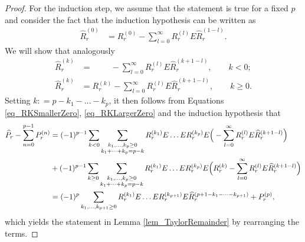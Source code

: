 \documentclass[a4paper,11pt]{article} %
\numberwithin{equation}{section}
\theoremstyle{definition}
\theoremstyle{remark}
\theoremstyle{plain}
\begin{document}
\begin{proof}
  For the induction step, we assume that the statement is true for a fixed 
  \( p \) and consider the fact that the induction hypothesis can be written as
  \begin{align}
          \widehat{R}_{r}^{ (0) } 
    & =
          R_{r}^{ (0) } 
        - 
          \sum_{l = 0}^{ \infty } 
          R_{r}^{ (l) } E \widehat{R}_{r}^{ (1 - l) }.
  \end{align}
  We will show that analogously
  \begin{align}
    \label{eq_RKSmallerZero}
          \widehat{R}_{r}^{ (k) } 
    & = 
        \qquad \
        - \sum_{l = 0}^{ \infty } 
          R_{r}^{ (l) } E \widehat{R}_{r}^{ (k + 1 - l) },
        \qquad k < 0;
    \\
    \label{eq_RKLargerZero}
          \widehat{R}_{r}^{ (k) } 
    & = 
          R_{r}^{ (k) } 
        - 
          \sum_{l = 0}^{ \infty } 
          R_{r}^{ (l) } E \widehat{R}_{r}^{ (k + 1 - l) }, 
        \qquad k \ge 0.
  \end{align}
  Setting \( k: = p - k_{1} - \dots - k_{p} \), it then follows from Equations
  \eqref{eq_RKSmallerZero}, \eqref{eq_RKLargerZero} and the induction hypothesis
  that 
  \begin{align}
         \widehat{P}_{r} - \sum_{n = 0}^{p - 1} P_{r}^{ (n) } 
    & =  
         (-1)^{p - 1} \sum_{k < 0} 
         \sum_{ \substack{ k_{1}, \dots, k_{p} \ge 0 \\
                           k_{1} + \dots + k_{p} = p - k 
                         }
              }
         R_{r}^{ ( k_{1} ) } E \dots E R_{r}^{ ( k_{p} ) } E
         \Big( - \sum_{l = 0}^{ \infty } 
                 R_{r}^{ (l) } E \widehat{R}_{r}^{ (k + 1 - l) } 
         \Big)
    \notag
    \\
    & + 
            (-1)^{p - 1} \sum_{k \ge 0} 
            \sum_{ \substack{ k_{1}, \dots, k_{p} \ge 0 \\
                              k_{1} + \dots + k_{p} = p - k 
                            }
              }
            R_{r}^{ ( k_{1} ) } E \dots E R_{r}^{ ( k_{p} ) } E
            \Big( 
              R_{r}^{ (k) } 
            - 
              \sum_{l = 0}^{ \infty } 
              R_{r}^{ (l) } E \widehat{R}_{r}^{ ( k + 1 - l ) } 
            \Big)
    \notag
    \\
    & = 
            (-1)^{p} 
            \sum_{k_{1}, \dots, k_{p + 1} \ge 0} 
            R_{r}^{ ( k_{1} ) } E \dots E R_{r}^{ ( k_{p + 1} ) } E 
            \widehat{R}_{r}^{ (p + 1 - k_{1} - \dots - k_{p + 1}) } 
            +
            P_{r}^{ (p) },
    \notag
  \end{align}
  which yields the statement in Lemma \ref{lem_TaylorRemainder} by rearranging
  the terms.


\end{proof}
\end{document}
